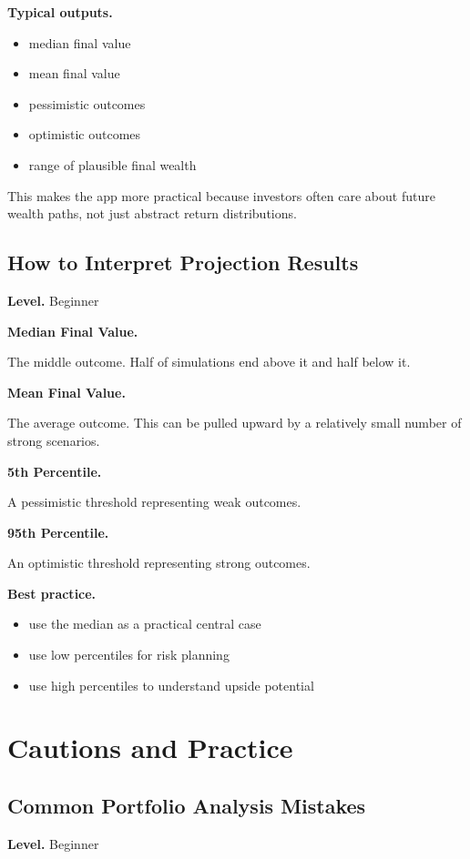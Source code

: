 \documentclass[11pt]{report}
\begin{document}
\textbf{Typical outputs.}

\begin{itemize}
\item median final value
\item mean final value
\item pessimistic outcomes
\item optimistic outcomes
\item range of plausible final wealth
\end{itemize}

This makes the app more practical because investors often care about future wealth paths, not just abstract return distributions.

\section{How to Interpret Projection Results}
\begin{callout}
\textbf{Level.} Beginner
\end{callout}

\textbf{Median Final Value.}

The middle outcome. Half of simulations end above it and half below it.

\textbf{Mean Final Value.}

The average outcome. This can be pulled upward by a relatively small number of strong scenarios.

\textbf{5th Percentile.}

A pessimistic threshold representing weak outcomes.

\textbf{95th Percentile.}

An optimistic threshold representing strong outcomes.

\textbf{Best practice.}

\begin{itemize}
\item use the median as a practical central case
\item use low percentiles for risk planning
\item use high percentiles to understand upside potential
\end{itemize}

\chapter{Cautions and Practice}

\section{Common Portfolio Analysis Mistakes}
\begin{callout}
\textbf{Level.} Beginner
\end{callout}
\end{document}
